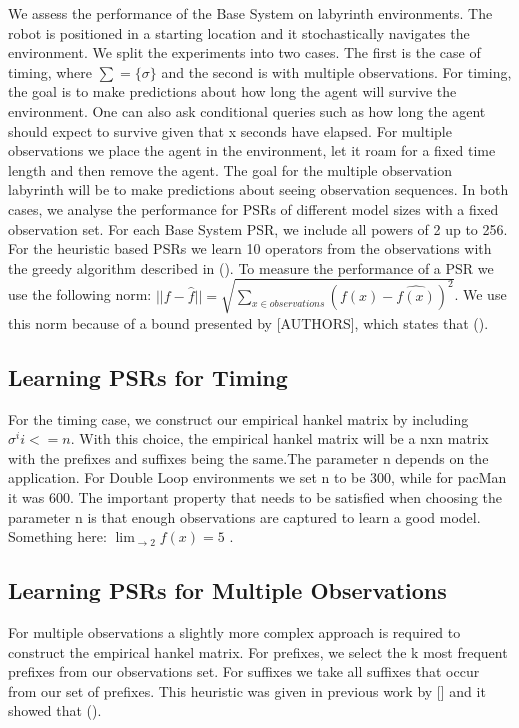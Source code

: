 \documentclass[letterpaper]{article}
\begin{document}
We assess the performance of the Base System on labyrinth environments. The robot is positioned in a starting location and it stochastically navigates the environment. We split the experiments into two cases. The first is the case of timing, where $\sum = \{\sigma\}$ and the second is with multiple observations. For timing, the goal is to make predictions about how long the agent will survive the environment. One can also ask conditional queries such as how long the agent should expect to survive given that x seconds have elapsed. For multiple observations we place the agent in the environment, let it roam for a fixed time length and then remove the agent. The goal for the multiple observation labyrinth will be to make predictions about seeing observation sequences. In both cases, we analyse the performance for PSRs of different model sizes with a fixed observation set. For each Base System PSR, we include all powers of 2 up to 256. For the heuristic based PSRs we learn 10 operators from the observations with the greedy algorithm described in (). To measure the performance of a PSR we use the following norm:
$||f - \hat{f}|| = \sqrt{\sum\nolimits_{x \in observations}(f(x) - \hat{f(x)})^2}$. We use this norm because of a bound presented by [AUTHORS], which states that (). 

\subsection{Learning PSRs for Timing}
For the timing case, we construct our empirical hankel matrix by including ${\sigma^i i<=n}$. With this choice, the empirical hankel matrix will be a nxn matrix with the prefixes and suffixes being the same.The parameter n depends on the application. For Double Loop environments we set n to be 300, while for pacMan it was 600. The important  property that needs to be satisfied when choosing the parameter n is that enough observations are captured to learn a good model. Something here: $\lim_{ \to 2} f(x) = 5$ .

\subsection{Learning PSRs for Multiple Observations}

For multiple observations a slightly more complex approach is required to construct the empirical hankel matrix. For prefixes, we select the k most frequent prefixes from our observations set. For suffixes we take all suffixes that occur from our set of prefixes. This heuristic was given in previous work by [] and it showed that ().
\end{document}
